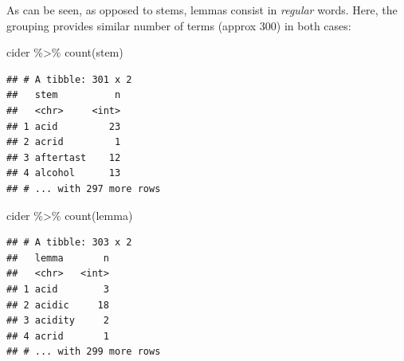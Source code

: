 \documentclass[
]{krantz}
\makeatletter
\newenvironment{Shaded}{\begin{snugshade}}{\end{snugshade}}
\newcommand{\AttributeTok}[1]{\textcolor[rgb]{0.61,0.61,0.61}{#1}}
\newcommand{\ConstantTok}[1]{\textcolor[rgb]{0,0,0}{#1}}
\newcommand{\FunctionTok}[1]{\textcolor[rgb]{0,0,0}{#1}}
\newcommand{\NormalTok}[1]{#1}
\newcommand{\OtherTok}[1]{\textcolor[rgb]{0.37,0.37,0.37}{#1}}
\newcommand{\SpecialCharTok}[1]{\textcolor[rgb]{0,0,0}{#1}}
\newcommand{\StringTok}[1]{\textcolor[rgb]{0.5,0.5,0.5}{#1}}
\newenvironment{kframe}{%
\medskip{}
\setlength{\fboxsep}{.8em}
 \def\at@end@of@kframe{}%
 \ifinner\ifhmode%
  \def\at@end@of@kframe{\end{minipage}}%
  \begin{minipage}{\columnwidth}%
 \fi\fi%
 \def\FrameCommand##1{\hskip\@totalleftmargin \hskip-\fboxsep
 \colorbox{shadecolor}{##1}\hskip-\fboxsep
     \hskip-\linewidth \hskip-\@totalleftmargin \hskip\columnwidth}%
 \MakeFramed {\advance\hsize-\width
   \@totalleftmargin\z@ \linewidth\hsize
   \@setminipage}}%
 {\par\unskip\endMakeFramed%
 \at@end@of@kframe}
\renewenvironment{Shaded}{\begin{kframe}}{\end{kframe}}
\makeatother
\begin{document}
\begin{Shaded}
\end{Shaded}

As can be seen, as opposed to stems, lemmas consist in \emph{regular} words. Here, the grouping provides similar number of terms (approx 300) in both cases:

\begin{Shaded}
\begin{Highlighting}[]
\NormalTok{cider }\SpecialCharTok{\%\textgreater{}\%} \FunctionTok{count}\NormalTok{(stem)}
\end{Highlighting}
\end{Shaded}

\begin{verbatim}
## # A tibble: 301 x 2
##   stem          n
##   <chr>     <int>
## 1 acid         23
## 2 acrid         1
## 3 aftertast    12
## 4 alcohol      13
## # ... with 297 more rows
\end{verbatim}

\begin{Shaded}
\begin{Highlighting}[]
\NormalTok{cider }\SpecialCharTok{\%\textgreater{}\%} \FunctionTok{count}\NormalTok{(lemma)}
\end{Highlighting}
\end{Shaded}

\begin{verbatim}
## # A tibble: 303 x 2
##   lemma       n
##   <chr>   <int>
## 1 acid        3
## 2 acidic     18
## 3 acidity     2
## 4 acrid       1
## # ... with 299 more rows
\end{verbatim}
\end{document}
